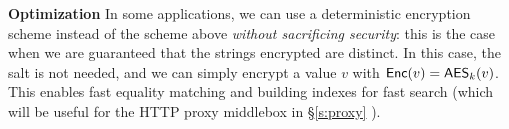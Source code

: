 \noindent\textbf{Optimization}
In some applications, we can use a deterministic encryption scheme instead of the scheme above {\em without sacrificing security}: this is the case when we are guaranteed that the strings encrypted are distinct. In this case, the salt is not needed, and we can simply encrypt a value $v$ with $\mathsf{Enc}(v) = \mathsf{AES}_k(v)$. This enables fast equality matching and building indexes for fast search (which will be useful for the HTTP proxy middlebox in \S\ref{s:proxy} ).



